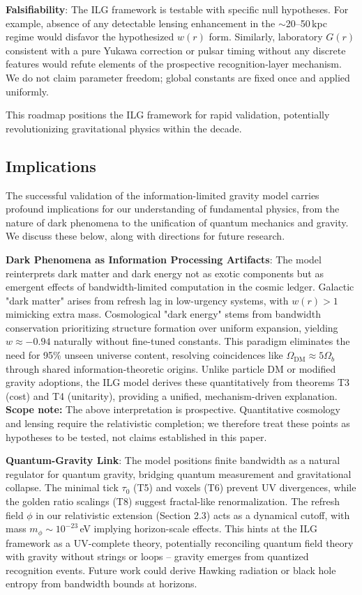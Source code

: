 \documentclass[12pt,a4paper]{article}
\begin{document}
\textbf{Falsifiability}: The ILG framework is testable with specific null hypotheses. For example, absence of any detectable lensing enhancement in the $\sim$20--50\,kpc regime would disfavor the hypothesized $w(r)$ form. Similarly, laboratory $G(r)$ consistent with a pure Yukawa correction or pulsar timing without any discrete features would refute elements of the prospective recognition-layer mechanism. We do not claim parameter freedom; global constants are fixed once and applied uniformly.

This roadmap positions the ILG framework for rapid validation, potentially revolutionizing gravitational physics within the decade.

\subsection{Implications}

The successful validation of the information-limited gravity model carries profound implications for our understanding of fundamental physics, from the nature of dark phenomena to the unification of quantum mechanics and gravity. We discuss these below, along with directions for future research.

\textbf{Dark Phenomena as Information Processing Artifacts}: The model reinterprets dark matter and dark energy not as exotic components but as emergent effects of bandwidth-limited computation in the cosmic ledger. Galactic "dark matter" arises from refresh lag in low-urgency systems, with $w(r) > 1$ mimicking extra mass. Cosmological "dark energy" stems from bandwidth conservation prioritizing structure formation over uniform expansion, yielding $w \approx -0.94$ naturally without fine-tuned constants. This paradigm eliminates the need for 95\% unseen universe content, resolving coincidences like $\Omega_\mathrm{DM} \approx 5 \Omega_b$ through shared information-theoretic origins. Unlike particle DM or modified gravity adoptions, the ILG model derives these quantitatively from theorems T3 (cost) and T4 (unitarity), providing a unified, mechanism-driven explanation.
\textbf{Scope note:} The above interpretation is prospective. Quantitative cosmology and lensing require the relativistic completion; we therefore treat these points as hypotheses to be tested, not claims established in this paper.

\textbf{Quantum-Gravity Link}: The model positions finite bandwidth as a natural regulator for quantum gravity, bridging quantum measurement and gravitational collapse. The minimal tick $\tau_0$ (T5) and voxels (T6) prevent UV divergences, while the golden ratio scalings (T8) suggest fractal-like renormalization. The refresh field $\phi$ in our relativistic extension (Section 2.3) acts as a dynamical cutoff, with mass $m_\phi \sim 10^{-23}$\,eV implying horizon-scale effects. This hints at the ILG framework as a UV-complete theory, potentially reconciling quantum field theory with gravity without strings or loops -- gravity emerges from quantized recognition events. Future work could derive Hawking radiation or black hole entropy from bandwidth bounds at horizons.
\end{document}
